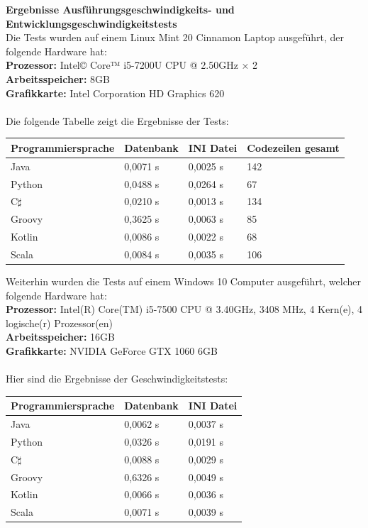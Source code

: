\documentclass[ngerman]{article}
\begin{document}
    \textbf{Ergebnisse Ausführungsgeschwindigkeits- und Entwicklungsgeschwindigkeitstests}\\
    Die Tests wurden auf einem Linux Mint 20 Cinnamon Laptop ausgeführt, der folgende Hardware hat:\\
    \textbf{Prozessor:} Intel© Core™ i5-7200U CPU @ 2.50GHz × 2\\
    \textbf{Arbeitsspeicher:} 8GB\\
    \textbf{Grafikkarte:} Intel Corporation HD Graphics 620\\\\
    Die folgende Tabelle zeigt die Ergebnisse der Tests:\\
    \begin{tabular}{|l|l|l|l|}
        \hline
        \textbf{Programmiersprache}&\textbf{Datenbank}&\textbf{INI Datei}&\textbf{Codezeilen gesamt}\\
        \hline
        Java&0,0071 s&0,0025 s&142\\
        \hline
        Python&0,0488 s&0,0264 s&67\\
        \hline
        C$\sharp$&0,0210 s&0,0013 s&134\\
        \hline
        Groovy&0,3625 s&0,0063 s&85\\
        \hline
        Kotlin&0,0086 s&0,0022 s&68\\
        \hline
        Scala&0,0084 s&0,0035 s&106\\
        \hline
    \end{tabular}
    Weiterhin wurden die Tests auf einem Windows 10 Computer ausgeführt, welcher folgende Hardware hat:\\
    \textbf{Prozessor:} Intel(R) Core(TM) i5-7500 CPU @ 3.40GHz, 3408 MHz, 4 Kern(e), 4 logische(r) Prozessor(en)\\
    \textbf{Arbeitsspeicher:} 16GB\\
    \textbf{Grafikkarte:} NVIDIA GeForce GTX 1060 6GB\\\\
    Hier sind die Ergebnisse der Geschwindigkeitstests:\\
    \begin{tabular}{|l|l|l|}
        \hline
        \textbf{Programmiersprache}&\textbf{Datenbank}&\textbf{INI Datei}\\
        \hline
        Java&0,0062 s&0,0037 s\\
        \hline
        Python&0,0326 s&0,0191 s\\
        \hline
        C$\sharp$&0,0088 s&0,0029 s\\
        \hline
        Groovy&0,6326 s&0,0049 s\\
        \hline
        Kotlin&0,0066 s&0,0036 s\\
        \hline
        Scala&0,0071 s&0,0039 s\\
        \hline
    \end{tabular}
\end{document}
